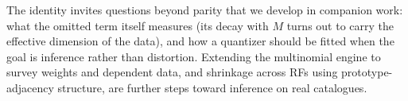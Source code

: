 \documentclass[runningheads]{llncs}
\newcommand{\todo}[1]{\textcolor{red}{[TODO: #1]}}
\begin{document}
The identity invites questions beyond parity that we develop in companion work: what the omitted term itself measures (its decay with $M$ turns out to carry the effective dimension of the data), and how a quantizer should be fitted when the goal is inference rather than distortion. Extending the multinomial engine to survey weights and dependent data, and shrinkage across RFs using prototype-adjacency structure, are further steps toward inference on real catalogues.




\end{document}
